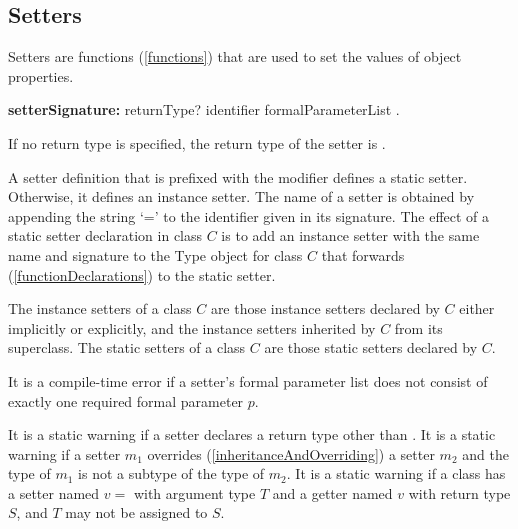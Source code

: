 \documentclass{article}
\newcommand{\code}[1]{{\sf #1}}
\begin{document}
\subsection{Setters}

\LMHash{}
Setters are functions (\ref{functions}) that are used to set the values of object properties.


\begin{grammar}
{\bf setterSignature:}
       returnType? \SET{} identifier formalParameterList
.
\end{grammar}

\LMHash{}
If no return type is specified, the return type of the setter is  \DYNAMIC{}.

\LMHash{}
A setter definition that is prefixed with the \STATIC{} modifier defines a static setter. Otherwise, it defines an instance setter. The name of a setter is  obtained by appending the  string `='  to the identifier given in its signature. The effect of a static setter declaration in class $C$ is to add an instance setter with the same name and signature to the \code{Type} object for class $C$ that forwards (\ref{functionDeclarations})  to the static setter.


\LMHash{}
The instance setters of a class $C$ are those instance setters declared by $C$ either implicitly or explicitly, and the instance setters inherited by $C$ from its superclass. The static setters of a class $C$ are those static setters declared by $C$.

\LMHash{}
It is a compile-time error if a setter's formal parameter list does not consist of exactly one required formal parameter $p$.  


\LMHash{}
It is a static warning if a setter declares a return type other than \VOID{}.
It is a static warning if a setter $m_1$ overrides  (\ref{inheritanceAndOverriding}) a setter $m_2$ and the type of $m_1$ is not a subtype of the type of $m_2$. It is a static warning if a class has a setter named $v=$ with argument type $T$ and a getter named $v$ with return type $S$, and $T$ may not be assigned to $S$.
\end{document}
